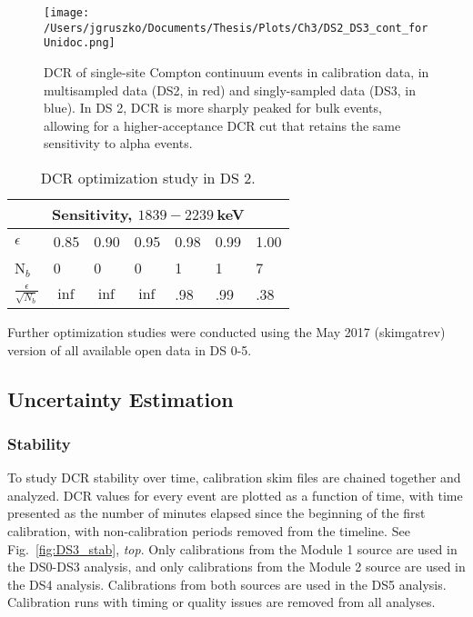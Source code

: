 \begin{figure}[h]
 \centering
 \texttt{[image: /Users/jgruszko/Documents/Thesis/Plots/Ch3/DS2\_DS3\_cont\_forUnidoc.png]}
 \caption[Comparison of DCR in singly-sampled and multi-sampled MJD data sets]{DCR of single-site Compton continuum events in calibration data, in multisampled data (DS2, in red) and singly-sampled data (DS3, in blue). In DS 2, DCR is more sharply peaked for bulk events, allowing for a higher-acceptance DCR cut that retains the same sensitivity to alpha events.} 
 \label{fig:DS2_DS3_comparison}
\end{figure}

\begin{table}[h]
\centering
\begin{tabular}{l | l l l l l l}
\hline
\multicolumn{7}{c}{Sensitivity, $1839 - 2239~$keV} \\
\hline
$\epsilon$ & 0.85 & 0.90 & 0.95 & 0.98 & 0.99 & 1.00 \\
N$_{b}$ & 0 & 0 & 0 & 1 & 1 & 7\\
$\frac{\epsilon}{\sqrt{N_b}}$ & $\inf$ & $\inf$ & $\inf$ & .98 & .99 & .38\\
\end{tabular}
 \caption{DCR optimization study in DS 2.} 
 \label{tab:DCR_opt_DS2}
\end{table}

Further optimization studies were conducted using the May 2017 (skimgatrev) version of all available open data in DS 0-5. 
\subsection{Uncertainty Estimation}
\subsubsection{Stability}
To study DCR stability over time, calibration skim files are chained together and analyzed.  DCR values for every event are plotted as a function of time, with time presented as the number of minutes elapsed since the beginning of the first calibration, with non-calibration periods removed from the timeline. See Fig.~\ref{fig:DS3_stab}, {\it top}. Only calibrations from the Module 1 source are used in the DS0-DS3 analysis, and only calibrations from the Module 2 source are used in the DS4 analysis.  Calibrations from both sources are used in the DS5 analysis. Calibration runs with timing or quality issues are removed from all analyses.  


